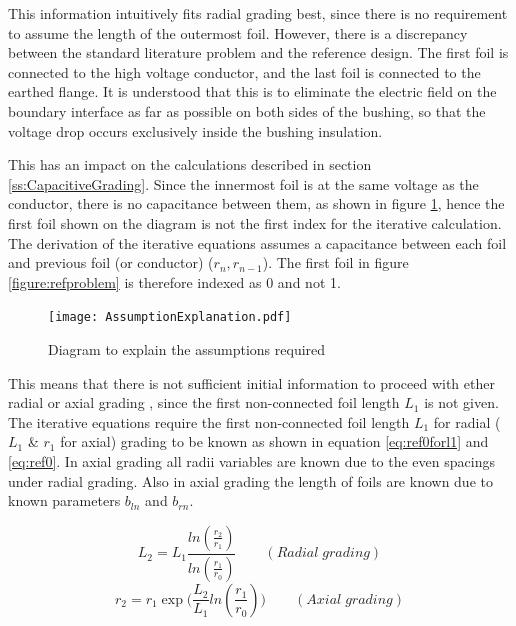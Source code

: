This information intuitively fits radial grading best, since there is no requirement to assume the length of the outermost foil.
However, there is a discrepancy between the standard literature problem and the reference design.
The first foil is connected to the high voltage conductor, and the last foil is connected to the earthed flange.
It is understood that this is to eliminate the electric field on the boundary interface as far as possible on both sides of the bushing, so that the voltage drop occurs exclusively inside the bushing insulation.

This has an impact on the calculations described in section \ref{ss:CapacitiveGrading}.
Since the innermost foil is at the same voltage as the conductor, there is no capacitance between them, as shown in figure \ref{figure:required assumptions}, hence the first foil shown on the diagram is not the first index for the iterative calculation.
The derivation of the iterative equations assumes a capacitance between each foil and previous foil (or conductor) ($r_n,r_{n-1}$). 
The first foil in figure \ref{figure:refproblem} is therefore indexed as 0 and not 1.

\begin{figure}[!h]
   \centering
   \texttt{[image: AssumptionExplanation.pdf]}
   \caption{Diagram to explain the assumptions required}
   \label{figure:required assumptions}
\end{figure}

This means that there is not sufficient initial information to proceed with ether radial or axial grading , since the first non-connected foil length $L_1$ is not given.
The iterative equations require the first non-connected foil length $L_1$ for radial ( $L_1$ \& $r_1$ for axial) grading to be known as shown in equation \ref{eq:ref0forl1} and \ref{eq:ref0}. 
In axial grading all radii variables are known due to the even spacings under radial grading. Also in axial grading the length of foils are known due to known parameters $b_{ln}$ and $b_{rn}$.

\begin{equation}
   \label{eq:ref0forl1}
   L_{2} = L_{1}\displaystyle\frac{{ln(\displaystyle\frac{r_{2}}{r_{1}})} }{ln(\displaystyle\frac{r_{1}}{r_{0}})} \qquad (Radial \; grading)
\end{equation}
\begin{equation}
  \label{eq:ref0}
  \displaystyle r_2= \displaystyle  r_{1} \displaystyle \exp\big( \displaystyle  \frac{L_2}{L_{1}}ln(\displaystyle \frac{r_1}{r_0})\big) \qquad (Axial \; grading)
\end{equation}



